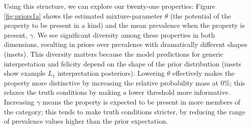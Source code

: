 \documentclass[12pt,letterpaper]{article}
\begin{document}




Using this structure, we can explore our twenty-one properties:
Figure \ref{fig:priors1a} shows the estimated mixture-parameter $\theta$ (the potential of the property to be present in a kind) and the mean prevalence when the property is present, $\gamma$. 
We see significant diversity among these properties in both dimensions, resulting in priors over prevalence with dramatically different shapes (insets). 
This diversity matters because the model predictions for generic interpretation and felicity depend on the shape of the prior distribution (insets show example $L_1$ interpretation posteriors).
Lowering $\theta$ effectively makes the property more distinctive by increasing the relative probability mass at 0\%; this relaxes the truth conditions by making a lower threshold more informative.
Increasing $\gamma$ means the property is expected to be present in more members of the category; this tends to make truth conditions stricter, by reducing the range of prevalence values higher than the prior expectation. 
\end{document}
